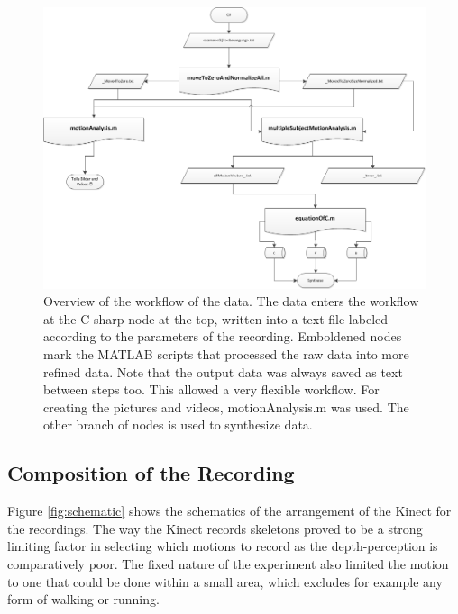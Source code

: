 \documentclass[a4paper]{article}
\newcommand{\CS}{C\nolinebreak\hspace{-.05em}\raisebox{.6ex}{\scriptsize\bf \#\ }}
\begin{document}
\begin{figure}
	\centering
	\includegraphics[width=16cm]{matlabaufbau.png}
	\caption{Overview of the workflow of the data. The data enters the workflow at the C-sharp node at the top, written into a text file labeled according to the parameters of the recording. Emboldened nodes mark the MATLAB scripts that processed the raw data into more refined data. Note that the output data was always saved as text between steps too. This allowed a very flexible workflow. For creating the pictures and videos, motionAnalysis.m was used. The other branch of nodes is used to synthesize data.}
	\label{fig:workflow}
\end{figure}

\subsection{Composition of the Recording}

Figure \ref{fig:schematic} shows the schematics of the arrangement of the Kinect for the recordings.
The way the Kinect records skeletons proved to be a strong limiting factor in selecting which motions to record as the depth-perception is comparatively poor.
The fixed nature of the experiment also limited the motion to one that could be done within a small area, which excludes for example any form of walking or running.
\end{document}
